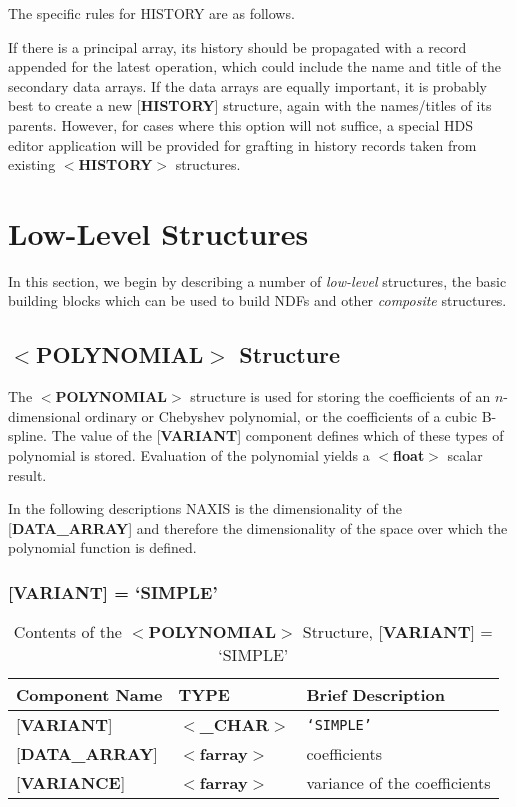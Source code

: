 \documentclass[twoside,11pt,nolof,noabs]{starlink}
\begin{document}
The specific rules for HISTORY are as follows.

If there is a principal array, its history should be propagated with
a record appended for the latest operation, which could include the
name and title of the secondary data arrays.  If the data arrays are
equally important, it is probably best
to create a new {[}\textbf{HISTORY}{]} structure,
again with the names/titles of its parents.  However, for cases
where this option will not suffice, a special
HDS editor application will be provided for grafting
in history records taken from
existing $<$\textbf{HISTORY}$>$ structures.

\section{Low-Level Structures\label{se:basic}}

In this section, we begin by describing a number of
\textit{low-level} structures, the basic building blocks which
can be used to build NDFs and other \textit{composite} structures.

\subsection{$<$\textbf{POLYNOMIAL}$>$ Structure\label{se:spolynomial}}

The $<$\textbf{POLYNOMIAL}$>$ structure is used for storing the
coefficients of an $n$-dimensional ordinary or Chebyshev polynomial,
or the coefficients of a cubic B-spline.  The value of the {[}\textbf{VARIANT}{]} component defines which of these types of polynomial is
stored.  Evaluation of the polynomial yields a $<$\textbf{float}$>$
scalar result.

In the following descriptions NAXIS is the dimensionality of the
{[}\textbf{DATA\_ARRAY}{]} and therefore the dimensionality of the space
over which the polynomial function is defined.

\subsubsection{{[}\textbf{VARIANT}{]} = `SIMPLE'}

\begin{table}[hbt]
\centering
\caption{Contents of the $<$\textbf{POLYNOMIAL}$>$ Structure,
               {[}\textbf{VARIANT}{]} = `SIMPLE'}
\begin{tabular}{|l|l|l|}
\hline
Component Name & TYPE & Brief Description \\ \hline
{[}\textbf{VARIANT}{]} & $<$\textbf{\_CHAR}$>$ & \texttt{`SIMPLE'} \\
{[}\textbf{DATA\_ARRAY}{]} & $<$\textbf{farray}$>$ & coefficients \\
{[}\textbf{VARIANCE}{]}  & $<$\textbf{farray}$>$ & variance of the
coefficients \\ \hline
\end{tabular}
\end{table}
\end{document}
